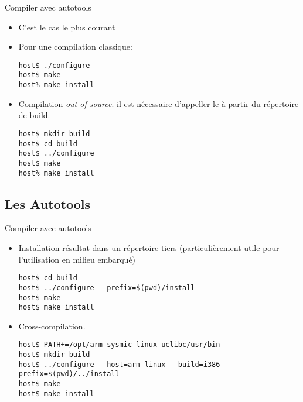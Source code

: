 \begin{frame}[fragile=singleslide]{Compiler avec autotools}
  \begin{itemize}
  \item C'est le cas le plus courant
  \item Pour une compilation classique:
\begin{lstlisting}
host$ ./configure
host$ make
host% make install
\end{lstlisting} %
  \item Compilation \emph{out-of-source}. il est nécessaire d'appeller
    le  à partir du répertoire de build.
\begin{lstlisting}
host$ mkdir build
host$ cd build
host$ ../configure
host$ make
host% make install
\end{lstlisting} %
  \end{itemize}
\end{frame}

\subsection{Les Autotools}

\begin{frame}[fragile=singleslide]{Compiler avec autotools}
  \begin{itemize}
  \item    Installation   résultat    dans    un   répertoire    tiers
    (particulièrement utile pour l'utilisation en milieu embarqué)
\begin{lstlisting}
host$ cd build
host$ ../configure --prefix=$(pwd)/install
host$ make
host$ make install
\end{lstlisting} %
  \item  Cross-compilation.
\begin{lstlisting}
host$ PATH+=/opt/arm-sysmic-linux-uclibc/usr/bin
host$ mkdir build
host$ ../configure --host=arm-linux --build=i386 --prefix=$(pwd)/../install
host$ make
host$ make install
\end{lstlisting} %
  \end{itemize}
\end{frame}

